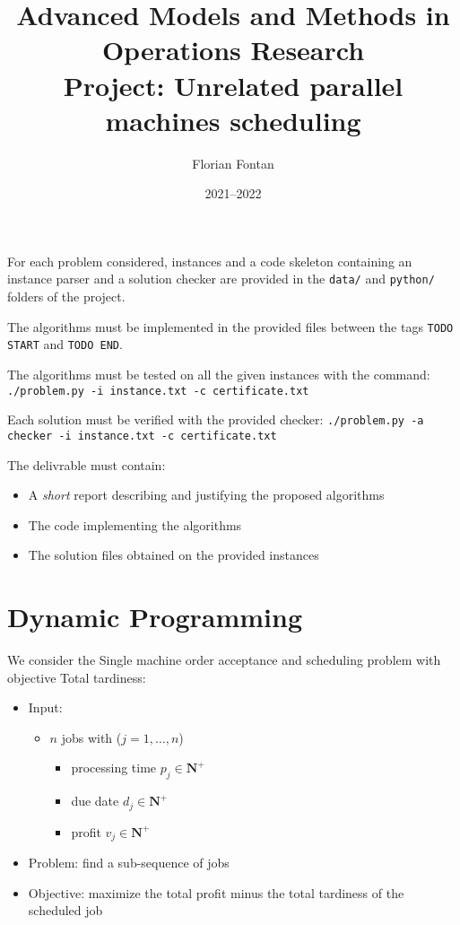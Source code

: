 \documentclass[a4paper]{article}
\author{Florian Fontan}
\title{Advanced Models and Methods in Operations Research \\ Project: Unrelated parallel machines scheduling}
\date{2021--2022}
\newcommand{\N}{\mathbf{N}}
\begin{document}
\maketitle

For each problem considered, instances and a code skeleton containing an instance parser and a solution checker are provided in the \texttt{data/} and \texttt{python/} folders of the project.

The algorithms must be implemented in the provided files between the tags \texttt{TODO START} and \texttt{TODO END}.

The algorithms must be tested on all the given instances with the command: \texttt{./problem.py -i instance.txt -c certificate.txt}

Each solution must be verified with the provided checker: \texttt{./problem.py -a checker -i instance.txt -c certificate.txt}

\bigskip

The delivrable must contain:
\begin{itemize}
  \item A \emph{short} report describing and justifying the proposed algorithms
  \item The code implementing the algorithms
  \item The solution files obtained on the provided instances
\end{itemize}

\section{Dynamic Programming}

We consider the Single machine order acceptance and scheduling problem with objective Total tardiness:
\begin{itemize}
  \item Input:
    \begin{itemize}
      \item $n$ jobs with ($j = 1, \dots, n$)
        \begin{itemize}
          \item processing time $p_j \in \N^+$
          \item due date $d_j \in \N^+$
          \item profit $v_j \in \N^+$
        \end{itemize}
    \end{itemize}
  \item Problem: find a sub-sequence of jobs
  \item Objective: maximize the total profit minus the total tardiness of the scheduled job
\end{itemize}
\end{document}
